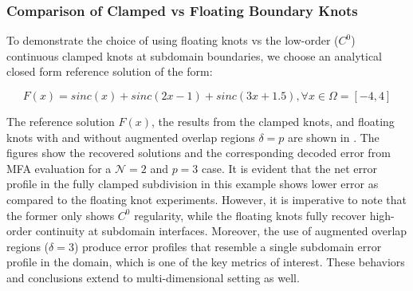 \subsubsection{Comparison of Clamped vs Floating Boundary Knots}

To demonstrate the choice of using floating knots vs the low-order ($C^0$) continuous clamped knots at subdomain boundaries, we choose an analytical closed form reference solution of the form:

\begin{equation}
	F(x) = sinc(x) + sinc(2x-1) + sinc(3x+1.5), \forall x \in \Omega=[-4, 4]
	\label{eqn:1d-asymmetric-sinc}
\end{equation}

The reference solution $F(x)$, the results from the clamped knots, and floating knots with and without augmented overlap regions $\delta=p$ are shown in . The figures show the recovered solutions and the corresponding decoded error from MFA evaluation for a $\mathcal{N}=2$ and $p=3$ case. It is evident that the net error profile in the fully clamped subdivision in this example shows lower error as compared to the floating knot experiments. However, it is imperative to note that the former only shows $C^0$ regularity, while the floating knots fully recover high-order continuity at subdomain interfaces. Moreover, the use of augmented overlap regions ($\delta=3$) produce error profiles that resemble a single subdomain error profile in the domain, which is one of the key metrics of interest. These behaviors and conclusions extend to multi-dimensional setting as well.

